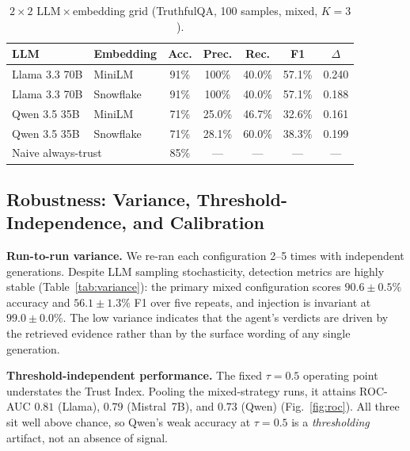 \documentclass[conference]{IEEEtran}
\begin{document}
\begin{table}[t]
\caption{$2\times2$ LLM\,$\times$\,embedding grid (TruthfulQA, 100 samples,
mixed, $K{=}3$).}
\label{tab:grid}
\centering
\small
\begin{tabular}{llccccc}
\toprule
LLM & Embedding & Acc. & Prec. & Rec. & F1 & $\Delta$ \\
\midrule
Llama 3.3 70B & MiniLM    & 91\% & 100\%  & 40.0\% & 57.1\% & 0.240 \\
Llama 3.3 70B & Snowflake & 91\% & 100\%  & 40.0\% & 57.1\% & 0.188 \\
Qwen 3.5 35B  & MiniLM    & 71\% & 25.0\% & 46.7\% & 32.6\% & 0.161 \\
Qwen 3.5 35B  & Snowflake & 71\% & 28.1\% & 60.0\% & 38.3\% & 0.199 \\
\midrule
\multicolumn{2}{l}{Naive always-trust} & 85\% & --- & --- & --- & --- \\
\bottomrule
\end{tabular}
\end{table}

\subsection{Robustness: Variance, Threshold-Independence, and Calibration}
\label{sec:robust}



\textbf{Run-to-run variance.} We re-ran each configuration 2--5 times with
independent generations. Despite LLM sampling stochasticity, detection metrics
are highly stable (Table~\ref{tab:variance}): the primary mixed configuration
scores $90.6{\pm}0.5\%$ accuracy and $56.1{\pm}1.3\%$ F1 over five repeats, and
injection is invariant at $99.0{\pm}0.0\%$. The low variance indicates that the
agent's verdicts are driven by the retrieved evidence rather than by the surface
wording of any single generation.

\textbf{Threshold-independent performance.} The fixed $\tau{=}0.5$ operating
point understates the Trust Index. Pooling the mixed-strategy runs, it attains
ROC-AUC $0.81$ (Llama), $0.79$ (Mistral~7B), and $0.73$ (Qwen)
(Fig.~\ref{fig:roc}). All three sit well above chance, so Qwen's weak accuracy
at $\tau{=}0.5$ is a \emph{thresholding} artifact, not an absence of signal.
\end{document}
